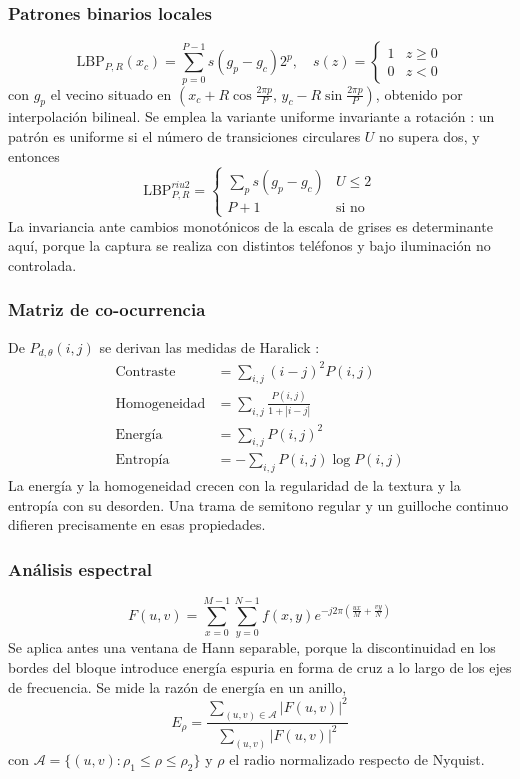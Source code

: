 \documentclass[conference]{IEEEtran}
\begin{document}
\subsubsection{Patrones binarios locales}
\begin{equation}
\mathrm{LBP}_{P,R}(x_c) = \sum_{p=0}^{P-1} s(g_p-g_c)2^p,\quad
s(z)=\begin{cases}1 & z\ge0\\ 0 & z<0\end{cases}
\end{equation}
con $g_p$ el vecino situado en
$(x_c+R\cos\frac{2\pi p}{P},\,y_c-R\sin\frac{2\pi p}{P})$, obtenido por
interpolación bilineal. Se emplea la variante uniforme invariante a
rotación \cite{ojala2002}: un patrón es uniforme si el número de
transiciones circulares $U$ no supera dos, y entonces
\begin{equation}
\mathrm{LBP}^{riu2}_{P,R} =
\begin{cases}\sum_p s(g_p-g_c) & U\le2\\ P+1 & \text{si no}\end{cases}
\end{equation}
La invariancia ante cambios monotónicos de la escala de grises es
determinante aquí, porque la captura se realiza con distintos teléfonos
y bajo iluminación no controlada.

\subsubsection{Matriz de co-ocurrencia}
De $P_{d,\theta}(i,j)$ se derivan las medidas de Haralick
\cite{haralick1973}:
\begin{align}
\text{Contraste} &= \sum_{i,j}(i-j)^2P(i,j)\\
\text{Homogeneidad} &= \sum_{i,j}\frac{P(i,j)}{1+|i-j|}\\
\text{Energía} &= \sum_{i,j}P(i,j)^2\\
\text{Entropía} &= -\sum_{i,j}P(i,j)\log P(i,j)
\end{align}
La energía y la homogeneidad crecen con la regularidad de la textura y
la entropía con su desorden. Una trama de semitono regular y un
guilloche continuo difieren precisamente en esas propiedades.

\subsubsection{Análisis espectral}
\begin{equation}
F(u,v) = \sum_{x=0}^{M-1}\sum_{y=0}^{N-1}
f(x,y)e^{-j2\pi\left(\frac{ux}{M}+\frac{vy}{N}\right)}
\end{equation}
Se aplica antes una ventana de Hann separable, porque la discontinuidad
en los bordes del bloque introduce energía espuria en forma de cruz a
lo largo de los ejes de frecuencia. Se mide la razón de energía en un
anillo,
\begin{equation}
E_\rho = \frac{\sum_{(u,v)\in\mathcal{A}}|F(u,v)|^2}{\sum_{(u,v)}|F(u,v)|^2}
\end{equation}
con $\mathcal{A}=\{(u,v): \rho_1\le\rho\le\rho_2\}$ y $\rho$ el radio
normalizado respecto de Nyquist.
\end{document}

